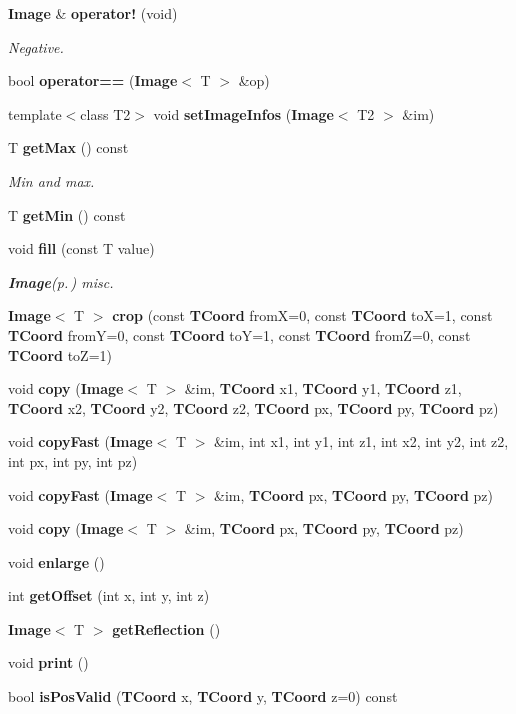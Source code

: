\begin{CompactItemize}
{\bf Image} \& {\bf operator!} (void)
\begin{CompactList}\small\item\em Negative. \item\end{CompactList}\item 
bool {\bf operator==} ({\bf Image}$<$ T $>$ \&op)
\item 
template$<$class T2$>$ void {\bf set\-Image\-Infos} ({\bf Image}$<$ T2 $>$ \&im)
\item 
T {\bf get\-Max} () const 
\begin{CompactList}\small\item\em Min and max. \item\end{CompactList}\item 
T {\bf get\-Min} () const 
\item 
void {\bf fill} (const T value)
\begin{CompactList}\small\item\em {\bf Image}{\rm (p.\,\pageref{classLibTIM_1_1Image})} misc. \item\end{CompactList}\item 
{\bf Image}$<$ T $>$ {\bf crop} (const {\bf TCoord} from\-X=0, const {\bf TCoord} to\-X=1, const {\bf TCoord} from\-Y=0, const {\bf TCoord} to\-Y=1, const {\bf TCoord} from\-Z=0, const {\bf TCoord} to\-Z=1)
\item 
void {\bf copy} ({\bf Image}$<$ T $>$ \&im, {\bf TCoord} x1, {\bf TCoord} y1, {\bf TCoord} z1, {\bf TCoord} x2, {\bf TCoord} y2, {\bf TCoord} z2, {\bf TCoord} px, {\bf TCoord} py, {\bf TCoord} pz)
\item 
void {\bf copy\-Fast} ({\bf Image}$<$ T $>$ \&im, int x1, int y1, int z1, int x2, int y2, int z2, int px, int py, int pz)
\item 
void {\bf copy\-Fast} ({\bf Image}$<$ T $>$ \&im, {\bf TCoord} px, {\bf TCoord} py, {\bf TCoord} pz)
\item 
void {\bf copy} ({\bf Image}$<$ T $>$ \&im, {\bf TCoord} px, {\bf TCoord} py, {\bf TCoord} pz)
\item 
void {\bf enlarge} ()
\item 
int {\bf get\-Offset} (int x, int y, int z)
\item 
{\bf Image}$<$ T $>$ {\bf get\-Reflection} ()
\item 
void {\bf print} ()
\item 
bool {\bf is\-Pos\-Valid} ({\bf TCoord} x, {\bf TCoord} y, {\bf TCoord} z=0) const 

\end{CompactItemize}
